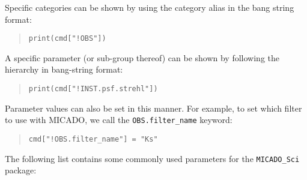 Specific categories can be shown by using the category alias in the bang string format:

\begin{quote}
\begin{alltt}
\begin{lstlisting}[frame=single]
print(cmd["!OBS"])
\end{lstlisting}
\end{alltt}
\end{quote}

A specific parameter (or sub-group thereof) can be shown by following the hierarchy in bang-string format:

\begin{quote}
\begin{alltt}
\begin{lstlisting}[frame=single]
print(cmd["!INST.psf.strehl"])
\end{lstlisting}
\end{alltt}
\end{quote}

Parameter values can also be set in this manner.
For example, to set which filter to use with MICADO, we call the \texttt{\textquotedbl{}OBS.filter\_name} keyword:

\begin{quote}
\begin{alltt}
\begin{lstlisting}[frame=single]
cmd["!OBS.filter_name"] = "Ks"
\end{lstlisting}
\end{alltt}
\end{quote}


The following list contains some commonly used parameters for the \texttt{MICADO\_Sci} package:

